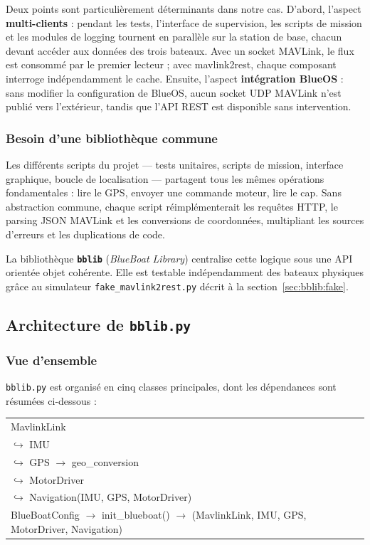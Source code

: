 Deux points sont particulièrement déterminants dans notre cas. D'abord, l'aspect \textbf{multi-clients} : pendant les tests, l'interface de supervision, les scripts de mission et les modules de logging tournent en parallèle sur la station de base, chacun devant accéder aux données des trois bateaux. Avec un socket MAVLink, le flux est consommé par le premier lecteur ; avec mavlink2rest, chaque composant interroge indépendamment le cache. Ensuite, l'aspect \textbf{intégration BlueOS} : sans modifier la configuration de BlueOS, aucun socket UDP MAVLink n'est publié vers l'extérieur, tandis que l'API REST est disponible sans intervention.

\subsubsection{Besoin d'une bibliothèque commune}

Les différents scripts du projet — tests unitaires, scripts de mission, interface graphique, boucle de localisation — partagent tous les mêmes opérations fondamentales : lire le GPS, envoyer une commande moteur, lire le cap. Sans abstraction commune, chaque script réimplémenterait les requêtes HTTP, le parsing JSON MAVLink et les conversions de coordonnées, multipliant les sources d'erreurs et les duplications de code.

La bibliothèque \textbf{\texttt{bblib}} (\textit{BlueBoat Library}) centralise cette logique sous une API orientée objet cohérente. Elle est testable indépendamment des bateaux physiques grâce au simulateur \texttt{fake\_mavlink2rest.py} décrit à la section~\ref{sec:bblib:fake}.

\subsection{Architecture de \texttt{bblib.py}}
\label{sec:bblib:arch}

\subsubsection{Vue d'ensemble}

\texttt{bblib.py} est organisé en cinq classes principales, dont les dépendances sont résumées ci-dessous :

\begin{center}
\ttfamily
\begin{tabular}{l}
MavlinkLink \\
\quad $\hookrightarrow$ IMU \\
\quad $\hookrightarrow$ GPS $\longrightarrow$ geo\_conversion \\
\quad $\hookrightarrow$ MotorDriver \\
\quad $\hookrightarrow$ Navigation(IMU, GPS, MotorDriver) \\[4pt]
BlueBoatConfig $\longrightarrow$ init\_blueboat() $\longrightarrow$ (MavlinkLink, IMU, GPS, MotorDriver, Navigation)
\end{tabular}
\end{center}

